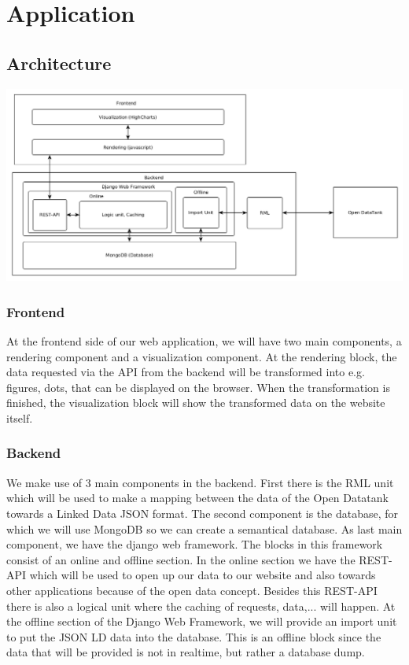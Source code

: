 \chapter{Application}
\section{Architecture}
\includegraphics[width=16cm]{fig/Architecture}

\subsection{Frontend}
At the frontend side of our web application, we will have two main components, a rendering component and a visualization component. At the rendering block, the data requested via the API from the backend will be transformed into e.g. figures, dots, that can be displayed on the browser. When the transformation is finished, the visualization block will show the transformed data on the website itself.

\subsection{Backend}
We make use of 3 main components in the backend. First there is the RML unit which will be used to make a mapping between the data of the Open Datatank towards a Linked Data JSON format. The second component is the database, for which we will use MongoDB so we can create a semantical database. As last main component, we have the django web framework. The blocks in this framework consist of an online and offline section. In the online section we have the REST-API which will be used to open up our data to our website and also towards other applications because of the open data concept. Besides this REST-API there is also a logical unit where the caching of requests, data,... will happen. At the offline section of the Django Web Framework, we will provide an import unit to put the JSON LD data into the database. This is an offline block since the data that will be provided is not in realtime, but rather a database dump.

